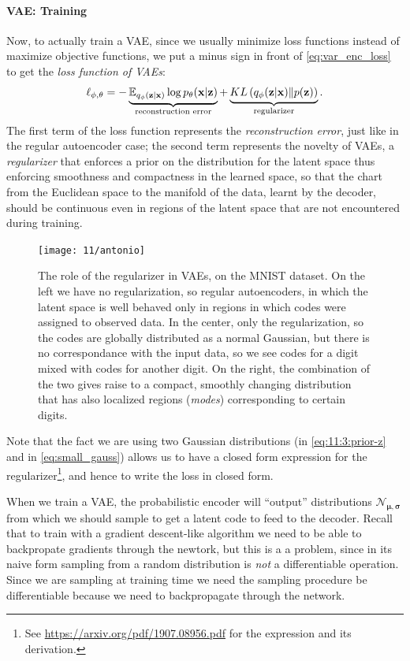 \paragraph{VAE: Training}
Now, to actually train a VAE, since we usually minimize loss functions instead of maximize objective functions, we put a minus sign in front of \cref{eq:var_enc_loss} to get the \emph{loss function of VAEs}:
\begin{equation}
	\ell_{\mathbf{\phi}, \mathbf{\theta}} = - \underbrace{\mathbb{E}_{q_\mathbf{\phi}(\mathbf{z}|\mathbf{x})} \log p_\mathbf{\theta}(\mathbf{x}|\mathbf{z})}_{\mathclap{\text{reconstruction error}}} + \underbrace{KL\left( q_\mathbf{\phi}(\mathbf{z} | \mathbf{x}) \| p(\mathbf{z}) \right)}_{\mathclap{\text{regularizer}}}.
\end{equation}
The first term of the loss function represents the \emph{reconstruction error}, just like in the regular autoencoder case; the second term represents the novelty of VAEs, a \emph{regularizer} that enforces a prior on the distribution for the latent space thus enforcing  smoothness and compactness in the learned space, so that the chart from the Euclidean space to the manifold of the data, learnt by the decoder, should be continuous even in regions of the latent space that are not encountered during training.

\begin{figure}[H]
	\centering
	\texttt{[image: 11/antonio]}
	\caption{The role of the regularizer in VAEs, on the MNIST dataset. On the left we have no regularization, so regular autoencoders, in which the latent space is well behaved only in regions in which codes were assigned to observed data. In the center, only the regularization, so the codes are globally distributed as a normal Gaussian, but there is no correspondance with the input data, so we see codes for a digit mixed with codes for another digit. On the right, the combination of the two gives raise to a compact, smoothly changing distribution that has also localized regions (\emph{modes}) corresponding to certain digits.}\label{fig:regularizer_vae}	
\end{figure}

Note that the fact we are using two Gaussian distributions (in \cref{eq:11:3:prior-z} and in \cref{eq:small_gauss}) allows us to have a closed form expression for the regularizer\footnote{See \url{https://arxiv.org/pdf/1907.08956.pdf} for the expression and its derivation.}, and hence to write the loss in closed form.

When we train a VAE, the probabilistic encoder will ``output'' distributions $\mathcal{N}_{\mathbf{\mu}, \mathbf{\sigma}}$ from which we should sample to get a latent code to feed to the decoder. Recall that to train with a gradient descent-like algorithm we need to be able to backpropate gradients through the newtork, but this is a a problem, since in its naive form sampling from a random distribution is \emph{not} a differentiable operation. Since we are sampling at training time we need the sampling procedure be differentiable because we need to backpropagate through the network. 

